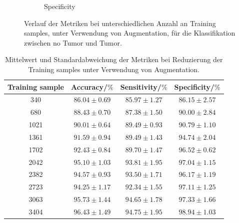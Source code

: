 \begin{figure}[H]
\begin{subfigure}[b]{0.48\textwidth}
    \caption{Specificity}
    \label{fig:augmentation_specificity}
  \end{subfigure}
  \caption{Verlauf der Metriken bei unterschiedlichen Anzahl an Training samples, unter Verwendung von Augmentation, für die Klassifikation zwischen no Tumor und Tumor.}
  \label{fig:augmentation_tu}
\end{figure}
\begin{table}[H]
    \centering
    {\small
        \begin{tabular}{cccc}
            \toprule
            Training sample & Accuracy/$\%$ & Sensitivity/$\%$ & Specificity/$\%$\\
            \midrule
            340  & $86.04 \pm 0.69$ & $85.97 \pm 1.27$ & $86.15 \pm 2.57$\\
            680  & $88.43 \pm 0.70$ & $87.38 \pm 1.50$ & $90.00 \pm 2.84$\\
            1021 & $90.01 \pm 0.64$ & $89.49 \pm 0.93$ & $90.79 \pm 1.10$\\
            1361 & $91.59 \pm 0.94$ & $89.49 \pm 1.43$ & $94.74 \pm 2.04$\\
            1702 & $92.43 \pm 0.84$ & $89.70 \pm 1.47$ & $96.52 \pm 0.62$\\
            2042 & $95.10 \pm 1.03$ & $93.81 \pm 1.95$ & $97.04 \pm 1.15$\\
            2382 & $94.57 \pm 0.93$ & $93.50 \pm 1.71$ & $96.17 \pm 1.19$\\
            2723 & $94.25 \pm 1.17$ & $92.34 \pm 1.55$ & $97.11 \pm 1.25$\\
            3063 & $95.73 \pm 1.44$ & $94.65 \pm 1.78$ & $97.33 \pm 1.66$\\
            3404 & $96.43 \pm 1.49$ & $94.75 \pm 1.95$ & $98.94 \pm 1.03$\\
            \bottomrule
        \end{tabular}}
  \caption{Mittelwert und Standardabweichung der Metriken bei Reduzierung der Training samples unter Verwendung von Augmentation.}
  \label{tab:augm-tunotu}
\end{table}

